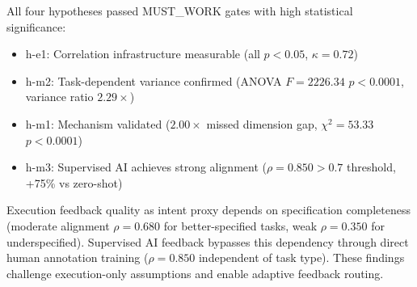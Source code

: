 All four hypotheses passed MUST\_WORK gates with high statistical significance:
\begin{itemize}
\item h-e1: Correlation infrastructure measurable (all $p<0.05$, $\kappa=0.72$)
\item h-m2: Task-dependent variance confirmed (ANOVA $F=2226.34$ $p<0.0001$, variance ratio $2.29\times$)
\item h-m1: Mechanism validated ($2.00\times$ missed dimension gap, $\chi^2=53.33$ $p<0.0001$)
\item h-m3: Supervised AI achieves strong alignment ($\rho=0.850 > 0.7$ threshold, +75\% vs zero-shot)
\end{itemize}

Execution feedback quality as intent proxy depends on specification completeness (moderate alignment $\rho=0.680$ for better-specified tasks, weak $\rho=0.350$ for underspecified). Supervised AI feedback bypasses this dependency through direct human annotation training ($\rho=0.850$ independent of task type). These findings challenge execution-only assumptions and enable adaptive feedback routing.
